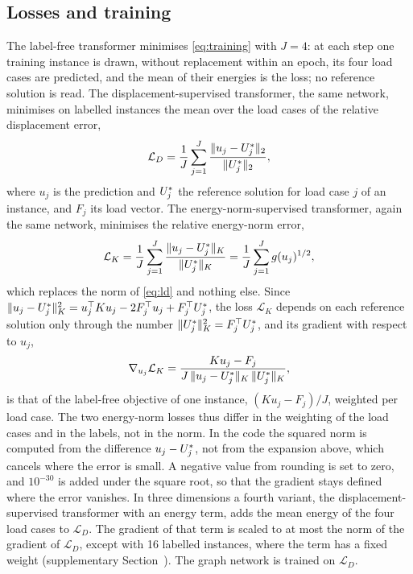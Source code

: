 \subsection{Losses and training}\label{sec:methods:training}

The label-free transformer minimises \eqref{eq:training} with $J=4$: at each step one
training instance is drawn, without replacement within an epoch, its four load cases are
predicted, and the mean of their energies is the loss; no reference solution is read. The
displacement-supervised transformer, the same network, minimises on labelled instances the
mean over the load cases of the relative displacement error,
\begin{equation}
\mathcal{L}_D=\frac{1}{J}\sum_{j=1}^{J}\frac{\lVert u_j-U^{\ast}_j\rVert_2}{\lVert U^{\ast}_j\rVert_2},
\label{eq:ld}
\end{equation}
where $u_j$ is the prediction and $U^{\ast}_j$ the reference solution for load case $j$ of an
instance, and $F_j$ its load vector. The energy-norm-supervised transformer, again the same
network, minimises the relative energy-norm error,
\begin{equation}
\mathcal{L}_K=\frac{1}{J}\sum_{j=1}^{J}\frac{\lVert u_j-U^{\ast}_j\rVert_K}{\lVert U^{\ast}_j\rVert_K}
=\frac{1}{J}\sum_{j=1}^{J}g(u_j)^{1/2},
\label{eq:lk}
\end{equation}
which replaces the norm of \eqref{eq:ld} and nothing else. Since
$\lVert u_j-U^{\ast}_j\rVert_K^2=u_j^{\top}Ku_j-2F_j^{\top}u_j+F_j^{\top}U^{\ast}_j$, the loss
$\mathcal{L}_K$ depends on each reference solution only through the number
$\lVert U^{\ast}_j\rVert_K^2=F_j^{\top}U^{\ast}_j$, and its gradient with respect to $u_j$,
\begin{equation}
\nabla_{u_j}\mathcal{L}_K=\frac{Ku_j-F_j}{J\,\lVert u_j-U^{\ast}_j\rVert_K\,\lVert U^{\ast}_j\rVert_K},
\label{eq:lkgrad}
\end{equation}
is that of the label-free objective of one instance, $(Ku_j-F_j)/J$, weighted per load case.
The two energy-norm losses thus differ in the weighting of the load cases and in the labels,
not in the norm. In the code the squared norm is computed from the difference
$u_j-U^{\ast}_j$, not from the expansion above, which cancels where the error is small. A negative value from rounding is set to zero, and $10^{-30}$ is added under the square root,
so that the gradient stays defined where the error vanishes. In three dimensions a fourth
variant, the displacement-supervised
transformer with an energy term, adds the mean energy of the four load cases to $\mathcal{L}_D$. The gradient of that term is
scaled to at most the norm of the gradient of $\mathcal{L}_D$, except with 16 labelled
instances, where the term has a fixed weight (supplementary Section~\SuppPrereg). The graph
network is trained on $\mathcal{L}_D$.

